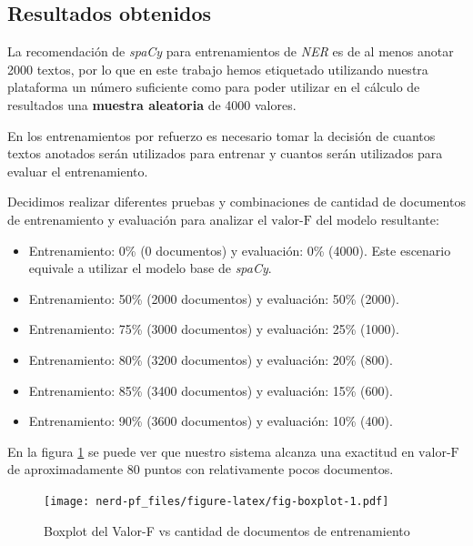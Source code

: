 \documentclass[12pt,a4paper,]{scrartcl}
\providecommand{\tightlist}{%
  \setlength{\itemsep}{0pt}\setlength{\parskip}{0pt}}
\begin{document}
\hypertarget{result-data}{%
\subsection{Resultados obtenidos}\label{result-data}}

La recomendación de \emph{spaCy} para entrenamientos de \emph{NER} es de al menos anotar 2000 textos, por lo que en este trabajo hemos etiquetado utilizando nuestra plataforma un número suficiente como para poder utilizar en el cálculo de resultados una \textbf{muestra aleatoria} de 4000 valores.

En los entrenamientos por refuerzo es necesario tomar la decisión de cuantos textos anotados serán utilizados para entrenar y cuantos serán utilizados para evaluar el entrenamiento.

Decidimos realizar diferentes pruebas y combinaciones de cantidad de documentos de entrenamiento y evaluación para analizar el \(\text{valor-F}\) del modelo resultante:

\begin{itemize}
\tightlist
\item
  Entrenamiento: 0\% (0 documentos) y evaluación: 0\% (4000). Este escenario equivale a utilizar el modelo base de \emph{spaCy}.
\item
  Entrenamiento: 50\% (2000 documentos) y evaluación: 50\% (2000).
\item
  Entrenamiento: 75\% (3000 documentos) y evaluación: 25\% (1000).
\item
  Entrenamiento: 80\% (3200 documentos) y evaluación: 20\% (800).
\item
  Entrenamiento: 85\% (3400 documentos) y evaluación: 15\% (600).
\item
  Entrenamiento: 90\% (3600 documentos) y evaluación: 10\% (400).
\end{itemize}

En la figura \ref{fig:fig-boxplot} se puede ver que nuestro sistema alcanza una exactitud en \(\text{valor-F}\) de aproximadamente 80 puntos con relativamente pocos documentos.

\begin{figure}[H]

{\centering \texttt{[image: nerd-pf\_files/figure-latex/fig-boxplot-1.pdf]} 

}

\caption{Boxplot del Valor-F vs cantidad de documentos de entrenamiento}\label{fig:fig-boxplot}
\end{figure}
\end{document}

